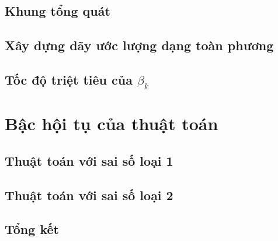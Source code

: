 \documentclass[12pt,twoside, a4paper, openany]{report}
\theoremstyle{plain}
\theoremstyle{definition}
\theoremstyle{remark}
\begin{document}
\section{Khung tổng quát}

\section{Xây dựng dãy ước lượng dạng toàn phương}

\section{Tốc độ triệt tiêu của $\beta_k$}

\chapter{Bậc hội tụ của thuật toán}

\section{Thuật toán với sai số loại 1}\label{sec:type1}

\section{Thuật toán với sai số loại 2}\label{sec:type2}

\newpage
\begin{center}
    \section*{Tổng kết}
\end{center}

\newpage


\end{document}
